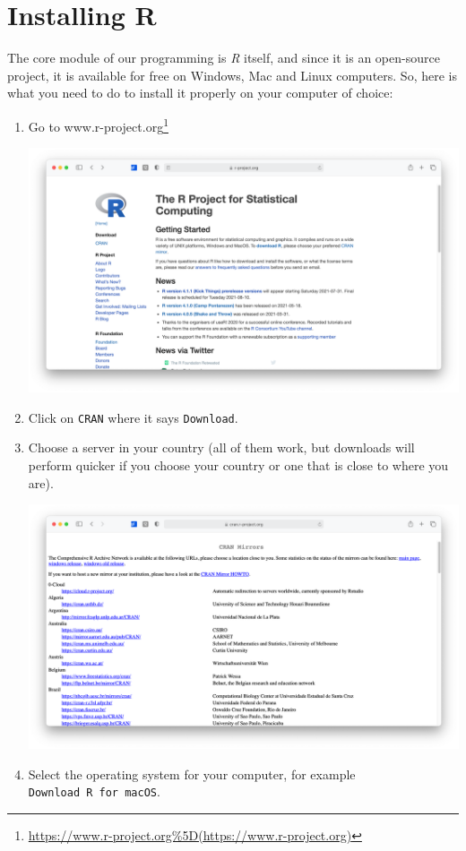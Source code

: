 \documentclass[
  letterpaper,
]{krantz}
\renewcommand{\href}[2]{#2\footnote{\url{#1}}}
\begin{document}
\section{Installing R}\label{sec-installing-r}

The core module of our programming is \emph{R} itself, and since it is
an open-source project, it is available for free on Windows, Mac and
Linux computers. So, here is what you need to do to install it properly
on your computer of choice:

\begin{enumerate}
\def\labelenumi{\arabic{enumi}.}
\item
  Go to
  \href{https://www.r-project.org\%5D(https://www.r-project.org)}{www.r-project.org}

  \includegraphics{images/chapter_03_img/r_project/00_r_project_page.png}
\item
  Click on \texttt{CRAN} where it says \texttt{Download}.
\item
  Choose a server in your country (all of them work, but downloads will
  perform quicker if you choose your country or one that is close to
  where you are).

  \includegraphics{images/chapter_03_img/r_project/01_r_project_cran_mirror.png}
\item
  Select the operating system for your computer, for example
  \texttt{Download\ R\ for\ macOS}.


\end{enumerate}
\end{document}
